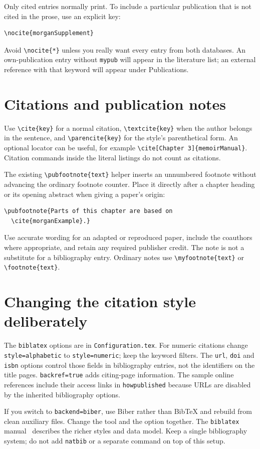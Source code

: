 Only cited entries normally print. To include a particular publication that
is not cited in the prose, use an explicit key:
\begin{lstlisting}
\nocite{morganSupplement}
\end{lstlisting}
\nocite{morganSupplement}
Avoid \verb|\nocite{*}| unless you really want every entry from both databases.
An own-publication entry without \texttt{mypub} will appear in the literature
list; an external reference with that keyword will appear under Publications.

\section{Citations and publication notes}
Use \verb|\cite{key}| for a normal citation, \verb|\textcite{key}| when the author
belongs in the sentence, and \verb|\parencite{key}| for the style's parenthetical
form. An optional locator can be useful, for example
\verb|\cite[Chapter 3]{memoirManual}|. Citation commands inside the literal
listings do not count as citations.

The existing \verb|\pubfootnote{text}| helper inserts an unnumbered footnote
without advancing the ordinary footnote counter. Place it directly after a
chapter heading or its opening abstract when giving a paper's origin:
\begin{lstlisting}
\pubfootnote{Parts of this chapter are based on
  \cite{morganExample}.}
\end{lstlisting}
Use accurate wording for an adapted or reproduced paper, include the
coauthors where appropriate, and retain any required publisher credit. The
note is not a substitute for a bibliography entry. Ordinary notes use
\verb|\myfootnote{text}| or \verb|\footnote{text}|.

\section{Changing the citation style deliberately}
The \texttt{biblatex} options are in \texttt{Configuration.tex}. For numeric
citations change \texttt{style=alphabetic} to \texttt{style=numeric}; keep the
keyword filters. The \texttt{url}, \texttt{doi} and \texttt{isbn} options control
those fields in bibliography entries, not the identifiers on the title pages.
\texttt{backref=true} adds citing-page information. The sample online references
include their access links in \texttt{howpublished} because URLs are disabled
by the inherited bibliography options.

If you switch to \texttt{backend=biber}, use Biber rather than BibTeX and rebuild
from clean auxiliary files. Change the tool and the option together. The
\texttt{biblatex} manual~\cite{biblatexManual} describes the richer styles and
data model. Keep a single bibliography system; do not add \texttt{natbib} or
a separate \verb|| command on top of this setup.
